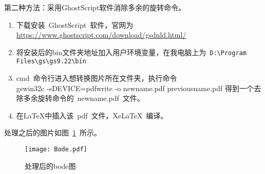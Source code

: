 \documentclass[../Main/thesis.tex]{subfiles}
\begin{document}
第二种方法：采用GhostScript软件消除多余的旋转命令。
\begin{enumerate}
    \item 下载安装~GhostScript~软件，官网为\url{https://www.ghostscript.com/download/gsdnld.html/}

    \item 将安装后的bin文件夹地址加入用户环境变量，在我电脑上为~\verb|D:|\verb|\Program Files|\verb|\gs|\verb|\gs9.22|\verb|\bin|

    \item cmd~命令行进入想转换图片所在文件夹，执行命令\\gswin32c -sDEVICE=pdfwrite -o newname.pdf  previousname.pdf
              得到一个去除多余旋转命令的~newname.pdf~文件。

    \item 在\LaTeX{}中插入该~pdf~文件，XeLaTeX~编译。
\end{enumerate}

处理之后的图片如图~\ref{Bode}~所示。
\begin{figure}[H]
  \centering
  \texttt{[image: Bode.pdf]}
  \caption{处理后的bode图}
  \label{Bode}
\end{figure}
\end{document}
